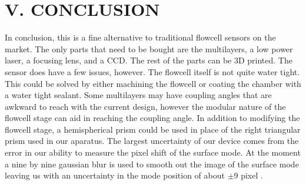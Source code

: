 \section*{\textbf{V. CONCLUSION}}
\hspace{0.25in}
In conclusion, this is a fine alternative to traditional flowcell sensors on the market. The only parts that need to be bought are the multilayers, a low power laser, a focusing lens, and a CCD. The rest of the parts can be 3D printed. The sensor does have a few issues, however. The flowcell itself is not quite water tight. This could be solved by either machining the flowcell or coating the chamber with a water tight sealant. Some multilayers may have coupling angles that are awkward to reach with the current design, however the modular nature of the flowcell stage can aid in reaching the coupling angle. In addition to modifying the flowcell stage, a hemispherical prism could be used in place of the right triangular prism used in our aparatus. The largest uncertainty of our device comes from the error in our ability to measure the pixel shift of the surface mode. At the moment a nine by nine gaussian blur is used to smooth out the image of the surface mode leaving us with an uncertainty in the mode position of about $\pm 9$ pixel .